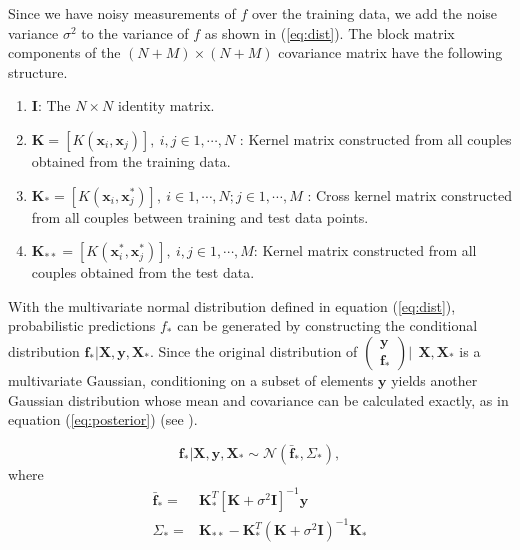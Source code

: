 \documentclass[sw, draft]{AGUTeX}
\begin{document}
\begin{article}
Since we have noisy measurements of $f$ over the training data, we add the noise variance $\sigma^2$ to the variance of $f$ as shown in (\ref{eq:dist}). The block matrix components of the $(N+M) \times (N+M)$ covariance matrix have the following structure.

\begin{enumerate}
      \item $\mathbf{I}$: The $N \times N$ identity matrix.
      \item $\mathbf{K} = [K(\mathbf{x}_i, \mathbf{x}_j)], \ i,j \in 1,\cdots,N$ : Kernel matrix constructed from all couples obtained from the training data.
      \item $\mathbf{K}_{*} = [K(\mathbf{x}_i, \mathbf{x}^{*}_j)], \ i \in 1,\cdots,N ; j \in 1,\cdots,M$ : Cross kernel matrix constructed from all couples between training and test data points.
      \item $\mathbf{K}_{**} = [K(\mathbf{x}^{*}_i, \mathbf{x}^{*}_j)], \ i,j \in 1,\cdots,M$: Kernel matrix constructed from all couples obtained from the test data.
\end{enumerate}

With the multivariate normal distribution defined in equation (\ref{eq:dist}), probabilistic predictions $f_*$ can be generated by constructing the conditional distribution $\mathbf{f_*}|\mathbf{X},\mathbf{y},\mathbf{X_*}$. Since the original distribution of $\left( \begin{array}{c} \mathbf{y} \\ \mathbf{f_*} \end{array} \right) | \ \ \mathbf{X}, \mathbf{X}_*$ is a multivariate Gaussian, conditioning on a subset of elements $\mathbf{y}$ yields another Gaussian distribution whose mean and covariance can be calculated exactly, as in equation (\ref{eq:posterior}) (see \citet{Rasmussen:2005:GPM:1162254}).

\begin{equation}
    \mathbf{f_*}|\mathbf{X},\mathbf{y},\mathbf{X_*} \sim \mathcal{N}(\mathbf{\bar{f}_*}, \Sigma_*)  \label{eq:posterior},
\end{equation}
where
\begin{align}
    \mathbf{\bar{f}_*} = & \mathbf{K}^T_{*} [\mathbf{K} + \sigma^{2} \mathbf{I}]^{-1} \mathbf{y} \label{eq:posteriormean} \\
    \Sigma_* = & \mathbf{K}_{**} - \mathbf{K}^T_{*} \left(\mathbf{K} + \sigma^{2} \mathbf{I}\right)^{-1} \mathbf{K}_{*} \label{eq:posteriorcov}
\end{align}


\end{article}
\end{document}

